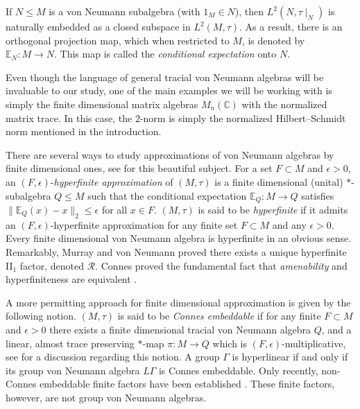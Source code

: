 \documentclass[11pt]{amsart}
\newcommand{\C}{{\mathbb{C}}}
\theoremstyle{definition}
\theoremstyle{remark}
\theoremstyle{definition}
\begin{document}
If $N\leq M$ is a von Neumann subalgebra (with $1_M\in N$), then $L^2(N,\tau\mid_N)$ is naturally embedded as a closed subspace in $L^2(M,\tau)$. As a result, there is an orthogonal projection map, which when restricted to $M$, is denoted by $\mathbb{E}_N:M\to N$. This map is called the \emph{conditional expectation} onto $N$. 


    Even though the language of general tracial von Neumann algebras will be invaluable to our study, one of the main examples we will be working with is simply the finite dimensional matrix algebras $M_n(\C)$ with the normalized matrix trace.
    In this case, the $2$-norm is simply the normalized Hilbert--Schmidt norm mentioned in the introduction.




There are several ways to study approximations of von Neumann algebras by finite dimensional ones, see \cite{BO} for this beautiful subject.
For a  set $F\subset M$ and $\epsilon>0$, an $(F,\epsilon)$-\emph{hyperfinite approximation} of $(M,\tau)$ is a finite dimensional (unital) $*$-subalgebra $Q \leq M$ such that the conditional expectation $\mathbb{E}_Q:M\to Q$ satisfies $\| \mathbb E_Q(x) - x \|_2 \leq \epsilon$ for all $x \in F$. 
$(M,\tau)$ is said to be \emph{hyperfinite} if it admits an $(F,\epsilon)$-hyperfinite approximation for any finite set $F\subset M$ and any $\epsilon>0$. 
Every finite dimensional von Neumann algebra is hyperfinite in an obvious sense. 
Remarkably, Murray and von Neumann proved there  exists a unique hyperfinite II$_1$ factor, denoted $\mathcal R$. Connes proved the fundamental fact that \emph{amenability} and hyperfiniteness are equivalent \cite{Connes}.


A more permitting approach for finite dimensional approximation is given by the following notion. $(M,\tau)$ is said to be \emph{Connes embeddable} if for any finite $F\subset M$ and $\epsilon>0$ there exists a finite dimensional tracial von Neumann algebra $Q$, and a linear, almost trace preserving $*$-map $\pi: M\to Q$ which is $(F,\epsilon)$-multiplicative, see \cite[Section 4]{Dog_Thesis} for a discussion regarding this notion. 
A group $\Gamma$ is hyperlinear if and only if its group von Neumann algebra $L\Gamma$ is Connes embeddable.  Only recently, non-Connes embeddable finite factors have been established \cite{MIP*=RE}. These finite factors, however, are not group von Neumann algebras. 
\end{document}
